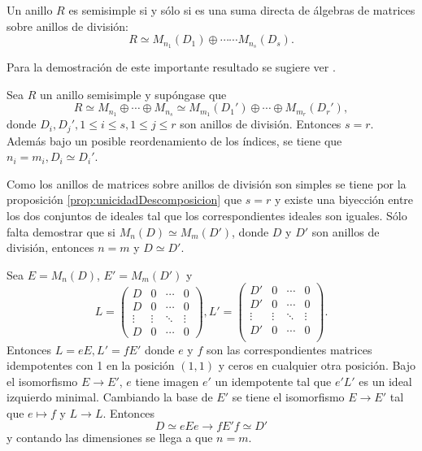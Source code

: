\begin{teorema}
Un anillo $R$ es semisimple si y sólo si es una suma directa de álgebras de matrices sobre anillos de división:
\[ R \simeq M_{n_1}(D_1)\oplus \cdots \cdots M_{n_s}(D_s).  \]
\end{teorema}
Para la demostración de este importante resultado se sugiere ver \cite[p. 200]{bib:AlgebraPostGrado}.
\begin{teorema}
Sea $R$ un anillo semisimple y supóngase que 
\[ R \simeq M_{n_1} \oplus \cdots \oplus M_{n_s} \simeq M_{m_1}(D_1')\oplus \cdots \oplus M_{m_r}(D_r'), \] donde $D_i, D_j', 1 \leq i \leq s, 1 \leq j \leq r$ son anillos de división. Entonces $s = r$. Además bajo un posible reordenamiento de los índices, se tiene que $n_i = m_i, D_i \simeq D_i'$. 
\end{teorema} 
\begin{proof*}
Como los anillos de matrices sobre anillos de división son simples se tiene por la proposición \ref{prop:unicidadDescomposicion} que $s = r$ y existe una biyección entre los dos conjuntos de ideales tal que los correspondientes ideales son iguales. Sólo falta demostrar que si $M_n(D)\simeq M_m(D')$, donde $D$ y $D'$ son anillos de división, entonces $n = m$ y $D \simeq D'$.

Sea $E = M_n(D)$, $E' = M_m(D')$ y 
\[ L = \begin{pmatrix} 
D &  0 & \cdots & 0 \\
D &  0 & \cdots & 0 \\
\vdots &\vdots& \ddots &\vdots \\
 D &  0 & \cdots & 0
\end{pmatrix} , L'=\begin{pmatrix}
D' & 0 & \cdots & 0\\
D' & 0 & \cdots & 0\\
\vdots &\vdots& \ddots &\vdots \\
D' & 0 & \cdots & 0\\
\end{pmatrix}.\]
Entonces $L = eE, L'= fE'$ donde $e$ y $f$ son las correspondientes matrices idempotentes con 1 en la posición $(1,1)$ y ceros en cualquier otra posición. Bajo el isomorfismo $E \to E'$, $e$ tiene imagen $e'$ un idempotente tal que $e'L'$ es un ideal izquierdo minimal. Cambiando la base de $E'$ se tiene el isomorfismo $E \to E'$ tal que $e \mapsto f$ y $L \to L$. Entonces \[ D \simeq eEe \to fE'f \simeq D' \] y contando las dimensiones se llega a que $n = m$.  
\end{proof*}
